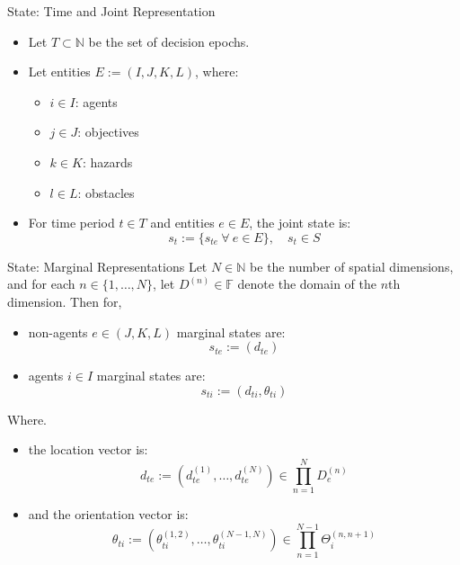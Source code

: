 \begin{frame}{State: Time and Joint Representation}
    \begin{itemize}
        \item Let \(T\subset\mathbb{N}\) be the set of decision epochs.
        \item Let entities \(E := (I, J, K, L)\), where:
        \begin{itemize}
            \item \(i\in I\): agents
            \item \(j\in J\): objectives
            \item \(k\in K\): hazards
            \item \(l\in L\): obstacles
        \end{itemize}
        \item For time period \(t\in T\) and entities \(e\in E\), the joint state is:
        \[
            s_t := \{s_{te}\ \forall\ e\in E\}, \quad s_t \in S
        \]
    \end{itemize}
\end{frame}

\begin{frame}{State: Marginal Representations}
    Let \(N\in \mathbb{N}\) be the number of spatial dimensions,
    and for each \(n \in \{1, \dots, N\}\),
    let \(D^{(n)} \in \mathbb{F}\) denote the domain of the \(n\)th dimension.
    Then for,
    \begin{itemize}
        \item non-agents \(e\in (J, K, L)\) marginal states are: \vspace{-0.8em}
        \[
            s_{te} := (d_{te})
        \]
        \item agents \(i\in I\) marginal states are: \vspace{-0.8em}
        \[
            s_{ti} := (d_{ti}, \theta_{ti})
        \]
    \end{itemize}
    Where.
    \begin{itemize}
        \item the location vector is: \vspace{-0.8em}
        \[
            d_{te} := \left(d_{te}^{(1)},\ldots, d_{te}^{(N)}\right) \in \prod_{n=1}^{N} D_{e}^{(n)}
        \]
        \item and the orientation vector is: \vspace{-0.8em}
        \[
            \theta_{ti} := \left(\theta_{ti}^{(1,2)},\ldots, \theta_{ti}^{(N-1,N)}\right) \in \prod_{n=1}^{N-1} \Theta_{i}^{(n,n+1)}
        \]
    \end{itemize}
\end{frame}

